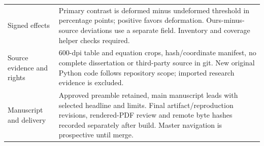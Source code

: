 \begin{longtable}{p{.23\linewidth}p{.70\linewidth}}
Signed effects & Primary contrast is deformed minus undeformed threshold in percentage points; positive favors deformation. Ours-minus-source deviations use a separate field. Inventory and coverage helper checks required.\\
Source evidence and rights & 600-dpi table and equation crops, hash/coordinate manifest, no complete dissertation or third-party source in git. New original Python code follows repository scope; imported research evidence is excluded.\\
Manuscript and delivery & Approved preamble retained, main manuscript leads with selected headline and limits. Final artifact/reproduction revisions, rendered-PDF review and remote byte hashes recorded separately after build. Master navigation is prospective until merge.\\
\bottomrule
\end{longtable}
